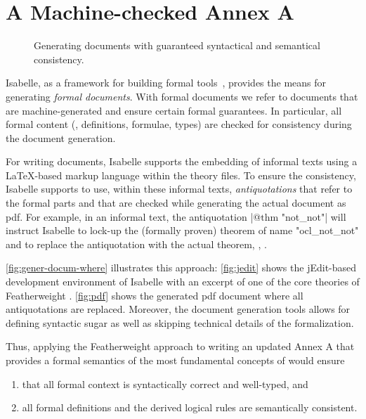 \section{A Machine-checked Annex A}
\begin{figure}[tb]
  \mbox{}\hfill
  \hfill%
  \hfill%
    \hfill\mbox{}
  \caption{Generating documents with guaranteed  syntactical and
    semantical consistency.}
  \label{fig:gener-docum-where}
\end{figure}
Isabelle, as a framework for building formal
tools~\cite{wenzel.ea:building:2007}, provides the means for
generating \emph{formal documents}.
With formal documents we refer to documents that are machine-generated
and ensure certain formal guarantees. In particular, all formal
content (\eg, definitions, formulae, types) are checked for
consistency during the document generation.

For writing documents, Isabelle supports the embedding of informal
texts using a \LaTeX-based markup language within the theory files. To
ensure the consistency, Isabelle supports to use, within these
informal texts, \emph{antiquotations} that refer to the formal parts and
that are checked while generating the actual document as
\acs{pdf}. For example, in an informal text, the antiquotation
\inlineisar|@{$\text{thm}$ "not_not"}| will instruct Isabelle to lock-up the
(formally proven) theorem of name \inlineisar"ocl_not_not" and to replace
the antiquotation with the actual theorem, \ie,
.

\autoref{fig:gener-docum-where}
illustrates this approach: \autoref{fig:jedit} shows the jEdit-based
development environment of Isabelle with an excerpt of one of the core
theories of Featherweight \OCL. \autoref{fig:pdf} shows the generated
\acs{pdf} document where all antiquotations are replaced. Moreover,
the document generation tools allows for defining syntactic sugar as
well as skipping technical details of the formalization.


Thus, applying the Featherweight \OCL approach to writing an updated
Annex A that provides a formal semantics of the most fundamental
concepts of \OCL would ensure
\begin{enumerate}
\item that all formal context is syntactically correct and well-typed,
  and
\item all formal definitions and the derived logical rules are
  semantically consistent.
\end{enumerate}
